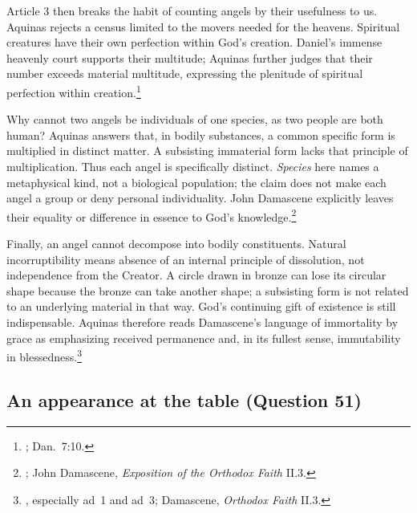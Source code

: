Article 3 then breaks the habit of counting angels by their usefulness to us. Aquinas rejects a census limited to the movers needed for the heavens. Spiritual creatures have their own perfection within God's creation. Daniel's immense heavenly court supports their multitude; Aquinas further judges that their number exceeds material multitude, expressing the plenitude of spiritual perfection within creation.\footnote{; Dan.~7:10.}

Why cannot two angels be individuals of one species, as two people are both human? Aquinas answers that, in bodily substances, a common specific form is multiplied in distinct matter. A subsisting immaterial form lacks that principle of multiplication. Thus each angel is specifically distinct. \emph{Species} here names a metaphysical kind, not a biological population; the claim does not make each angel a group or deny personal individuality. John Damascene explicitly leaves their equality or difference in essence to God's knowledge.\footnote{; John Damascene, \emph{Exposition of the Orthodox Faith} II.3.}

Finally, an angel cannot decompose into bodily constituents. Natural incorruptibility means absence of an internal principle of dissolution, not independence from the Creator. A circle drawn in bronze can lose its circular shape because the bronze can take another shape; a subsisting form is not related to an underlying material in that way. God's continuing gift of existence is still indispensable. Aquinas therefore reads Damascene's language of immortality by grace as emphasizing received permanence and, in its fullest sense, immutability in blessedness.\footnote{, especially ad~1 and ad~3; Damascene, \emph{Orthodox Faith} II.3.}


\subsection{An appearance at the table (Question 51)}

